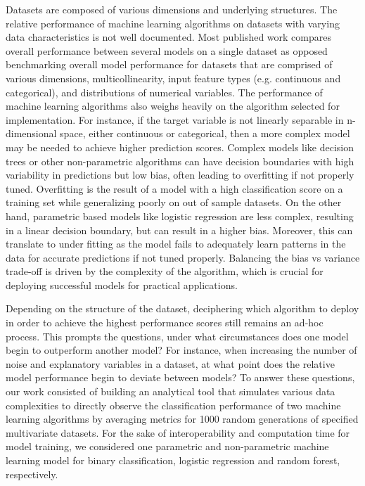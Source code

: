 \documentclass{llncs}
\begin{document}
Datasets are composed of various dimensions and underlying structures. The relative performance of machine learning algorithms on datasets with varying data characteristics is not well documented. Most published work compares overall performance between several models on a single dataset as opposed benchmarking overall model performance for datasets that are comprised of various dimensions, multicollinearity, input feature types (e.g. continuous and categorical), and distributions of numerical variables. The performance of machine learning algorithms also weighs heavily on the algorithm selected for implementation. For instance, if the target variable is not linearly separable in n-dimensional space, either continuous or categorical, then a more complex model may be needed to achieve higher prediction scores. Complex models like decision trees or other non-parametric algorithms can have decision boundaries with high variability in predictions but low bias, often leading to overfitting if not properly tuned. Overfitting is the result of a model with a high classification score on a training set while generalizing poorly on out of sample datasets. On the other hand, parametric based models like logistic regression are less complex, resulting in a linear decision boundary, but can result in a higher bias. Moreover, this can translate to under fitting as the model fails to adequately learn patterns in the data for accurate predictions if not tuned properly. Balancing the bias vs variance trade-off is driven by the complexity of the algorithm, which is crucial for deploying successful models for practical applications.

Depending on the structure of the dataset, deciphering which algorithm to deploy in order to achieve the highest performance scores still remains an ad-hoc process. This prompts the questions, under what circumstances does one model begin to outperform another model? For instance, when increasing the number of noise and explanatory variables in a dataset, at what point does the relative model performance begin to deviate between models? To answer these questions, our work consisted of building an analytical tool that simulates various data complexities to directly observe the classification performance of two machine learning algorithms by averaging metrics for 1000 random generations of specified multivariate datasets. For the sake of interoperability and computation time for model training, we considered one parametric and non-parametric machine learning model for binary classification, logistic regression and random forest, respectively.
\end{document}
